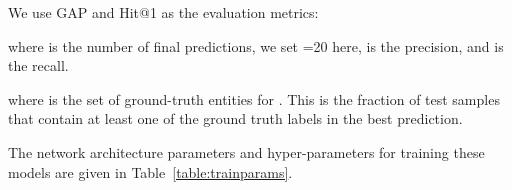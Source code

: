 \documentclass[runningheads]{llncs}
\begin{document}
We use GAP and Hit@1 \cite{DBLP:journals/corr/Abu-El-HaijaKLN16}\cite{startcode} as the evaluation metrics:

 where  is the number of final predictions, we set =20 here,  is the precision, and  is the recall.  

 where   is the set of ground-truth entities for . This is the fraction of test samples that contain at least one of the ground truth labels in the best prediction.


The network architecture parameters and hyper-parameters for training these models are given in Table~\ref{table:trainparams}.

\begin{table}[]
\begin{center}
\caption{Training settings}
\label{table:trainparams}
\end{center}
\end{table}
\end{document}
